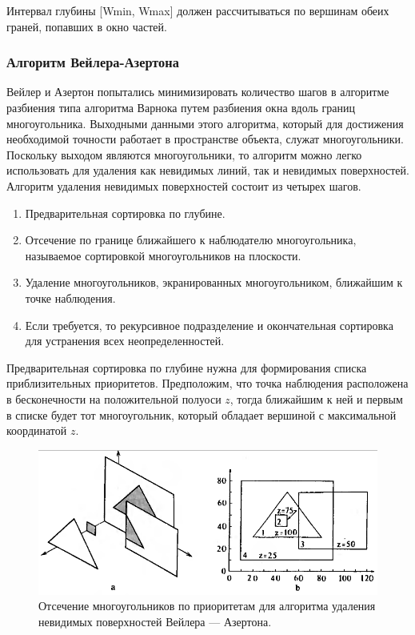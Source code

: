 Интервал глубины [Wmin, Wmax] должен рассчитываться по вершинам обеих граней, попавших в окно частей.~\cite{polski}




\subsubsection{Алгоритм Вейлера-Азертона}

\hspace{1.25cm}
Вейлер и Азертон попытались минимизировать количество шагов в алгоритме разбиения типа алгоритма Варнока путем разбиения окна вдоль границ многоугольника. Выходными данными этого алгоритма, который для достижения необходимой точности работает в пространстве объекта, служат многоугольники. Поскольку выходом являются многоугольники, то алгоритм можно легко использовать для удаления как невидимых линий, так и невидимых поверхностей. Алгоритм удаления невидимых поверхностей состоит из четырех шагов.

\begin{enumerate}
    \item Предварительная сортировка по глубине.
    \item Отсечение по границе ближайшего к наблюдателю многоугольника, называемое сортировкой многоугольников на плоскости.
    \item Удаление многоугольников, экранированных многоугольником, ближайшим к точке наблюдения.
    \item Если требуется, то рекурсивное подразделение и окончательная сортировка для устранения всех неопределенностей.
\end{enumerate}

Предварительная сортировка по глубине нужна для формирования списка приблизительных приоритетов. Предположим, что точка наблюдения расположена в бесконечности на положительной полуоси \(z\), тогда ближайшим к ней и первым в списке будет тот многоугольник, который обладает вершиной с максимальной координатой \(z\).

\begin{figure}[H]
    \centering
    \includegraphics[width=\textwidth]{img/veyler-aserton_algorithm_1.png}
    \caption{Отсечение многоугольников по приоритетам для алгоритма удаления невидимых поверхностей Вейлера — Азертона.}
    \label{fig:veyler-aserton_algorithm_1}
\end{figure}

